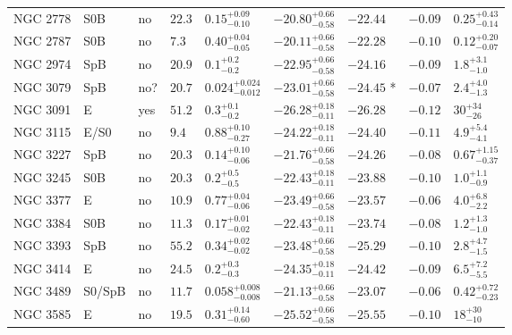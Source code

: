 \begin{table*}
\begin{center}
\begin{tabular}{lllllllll}
NGC 2778  &  S0B  &  no   &  $22.3$  &  $0.15_{-0.10}^{+0.09}$   &  $-20.80_{-0.58}^{+0.66}$   &  $-22.44$   &  $-0.09$  &  $0.25_{-0.14}^{+0.43}$   \\ 
NGC 2787  &  S0B  &  no   &  $7.3$  &  $0.40_{-0.05}^{+0.04}$   &  $-20.11_{-0.58}^{+0.66}$   &  $-22.28$   &  $-0.10$  &  $0.12_{-0.07}^{+0.20}$   \\ 
NGC 2974  &  SpB  &  no   &  $20.9$  &  $0.1_{-0.2}^{+0.2}$   &  $-22.95_{-0.58}^{+0.66}$   &  $-24.16$   &  $-0.09$  &  $1.8_{-1.0}^{+3.1}$   \\ 
NGC 3079  &  SpB  &  no?  &  $20.7$  &  $0.024_{-0.012}^{+0.024}$   &  $-23.01_{-0.58}^{+0.66}$   &  $-24.45$  *  &  $-0.07$  &  $2.4_{-1.3}^{+4.0}$   \\ 
NGC 3091  &  E  &  yes   &  $51.2$  &  $0.3_{-0.2}^{+0.1}$   &  $-26.28_{-0.11}^{+0.18}$   &  $-26.28$   &  $-0.12$  &  $30_{-26}^{+34}$   \\ 
NGC 3115  &  E/S0  &  no   &  $9.4$  &  $0.88_{-0.27}^{+0.10}$   &  $-24.22_{-0.11}^{+0.18}$   &  $-24.40$   &  $-0.11$  &  $4.9_{-4.1}^{+5.4}$   \\ 
NGC 3227  &  SpB  &  no   &  $20.3$  &  $0.14_{-0.06}^{+0.10}$   &  $-21.76_{-0.58}^{+0.66}$   &  $-24.26$   &  $-0.08$  &  $0.67_{-0.37}^{+1.15}$   \\ 
NGC 3245  &  S0B  &  no   &  $20.3$  &  $0.2_{-0.5}^{+0.5}$   &  $-22.43_{-0.11}^{+0.18}$   &  $-23.88$   &  $-0.10$  &  $1.0_{-0.9}^{+1.1}$   \\ 
NGC 3377  &  E  &  no   &  $10.9$  &  $0.77_{-0.06}^{+0.04}$   &  $-23.49_{-0.58}^{+0.66}$   &  $-23.57$   &  $-0.06$  &  $4.0_{-2.2}^{+6.8}$   \\ 
NGC 3384  &  S0B  &  no   &  $11.3$  &  $0.17_{-0.02}^{+0.01}$   &  $-22.43_{-0.11}^{+0.18}$   &  $-23.74$   &  $-0.08$  &  $1.2_{-1.0}^{+1.3}$   \\ 
NGC 3393  &  SpB  &  no   &  $55.2$  &  $0.34_{-0.02}^{+0.02}$   &  $-23.48_{-0.58}^{+0.66}$   &  $-25.29$   &  $-0.10$  &  $2.8_{-1.5}^{+4.7}$   \\ 
NGC 3414  &  E  &  no   &  $24.5$  &  $0.2_{-0.3}^{+0.3}$   &  $-24.35_{-0.11}^{+0.18}$   &  $-24.42$   &  $-0.09$  &  $6.5_{-5.5}^{+7.2}$   \\ 
NGC 3489  &  S0/SpB  &  no   &  $11.7$  &  $0.058_{-0.008}^{+0.008}$   &  $-21.13_{-0.58}^{+0.66}$   &  $-23.07$   &  $-0.06$  &  $0.42_{-0.23}^{+0.72}$   \\ 
NGC 3585  &  E  &  no   &  $19.5$  &  $0.31_{-0.60}^{+0.14}$   &  $-25.52_{-0.58}^{+0.66}$   &  $-25.55$   &  $-0.10$  &  $18_{-10}^{+30}$   \\ 

\end{tabular}
\end{center}
\end{table*}
